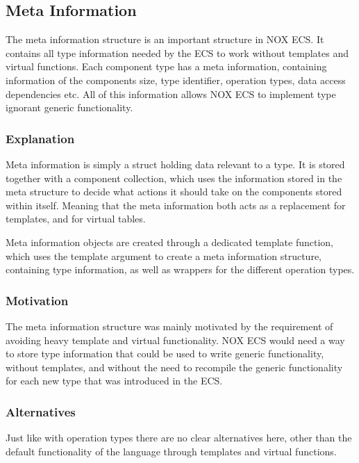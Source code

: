 \subsection{Meta Information}
\label{subsec:detailed_meta_information}
The meta information structure is an important structure in NOX ECS.
It contains all type information needed by the ECS to work without
templates and virtual functions.
Each component type has a meta information, containing information
of the components size, type identifier,
operation types, data access dependencies etc.
All of this information allows NOX ECS to implement type ignorant generic functionality.

\subsubsection{Explanation}
Meta information is simply a struct holding data relevant to a type.
It is stored together with a component collection,
which uses the information stored in the meta structure to decide what actions
it should take on the components stored within itself.
Meaning that the meta information both acts as a replacement for templates,
and for virtual tables.

Meta information objects are created through a dedicated template function,
which uses the template argument to create a meta information structure,
containing type information, as well as wrappers for the different operation types.

\subsubsection{Motivation}
The meta information structure was mainly motivated by the requirement of avoiding heavy template and virtual functionality.
NOX ECS would need a way to store type information that could be used to write generic functionality, without templates,
and without the need to recompile the generic functionality for each new type that was introduced in the ECS.

\subsubsection{Alternatives}
Just like with operation types there are no clear alternatives here, other than
the default functionality of the language through templates and virtual functions.

